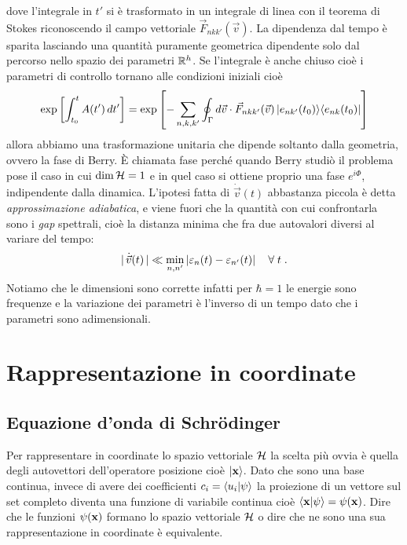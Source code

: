 dove l'integrale in $ t' $ si è trasformato in un integrale di linea con il teorema di Stokes riconoscendo il campo vettoriale 
$ \vec{F}_{nkk'}(\vec{v}) $. La dipendenza dal tempo è sparita lasciando una quantità puramente geometrica dipendente solo dal percorso nello spazio 
dei parametri $ \mathbb{R}^h $. Se l'integrale è anche chiuso cioè i parametri di controllo tornano alle condizioni iniziali cioè 
\begin{align*}
  \exp \left[ \int_{t_0}^t A(t') \, dt' \right] 
  = \exp \left[ - \sum_{n,k,k'} \oint_\Gamma d\vec{v}  \cdot \vec{F}_{nkk'}(\vec{v}) \,\vert e_{nk'}(t_0) \rangle \langle e_{nk}(t_0) \vert \right]
\end{align*}
allora abbiamo una trasformazione unitaria che dipende soltanto dalla geometria, ovvero la fase di Berry. È chiamata fase perché quando Berry studiò il 
problema pose il caso in cui $ \dim \operatorname{\mathcal{H}} = 1 $ e in quel caso si ottiene proprio una fase $ e^{i \Phi} $, indipendente dalla dinamica. L'ipotesi fatta 
di $ \dot{\vec{v}}(t) $ abbastanza piccola è detta \textit{approssimazione adiabatica}, e viene fuori che la quantità con cui confrontarla sono i 
\textit{gap} spettrali, cioè la distanza minima che fra due autovalori diversi al variare del tempo: 
\begin{align*}
  |\, \dot{\vec{v}} (t) \, | \ll \min_{n,n'} \left|{\varepsilon_n(t) - \varepsilon_{n'}(t)}\right| \quad \forall\; t \;.
\end{align*}
Notiamo che le dimensioni sono corrette infatti per $ \hbar = 1 $ le energie sono frequenze e la variazione dei parametri è l'inverso di un tempo dato 
che i parametri sono adimensionali.

\chapter{Rappresentazione in coordinate}

\section{Equazione d'onda di Schrödinger}

Per rappresentare in coordinate lo spazio vettoriale $ \operatorname{\mathcal{H}} $ la scelta più ovvia è quella degli autovettori dell'operatore posizione cioè 
$ \vert \mathbf{x} \rangle $. Dato che sono una base continua, invece di avere dei coefficienti $ c_i = \langle u_i | \psi \rangle $ la proiezione di un vettore sul set completo 
diventa una funzione di variabile continua cioè $ \langle \mathbf{x} | \psi \rangle = \psi(\mathbf{x}) $. Dire che le funzioni $ \psi(\mathbf{x}) $ formano lo spazio vettoriale 
$ \operatorname{\mathcal{H}} $ o dire che ne sono una sua rappresentazione in coordinate è equivalente.

